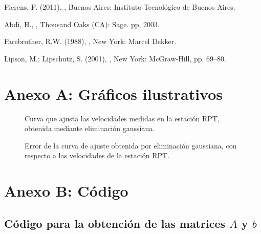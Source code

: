 \documentclass[%
	final,
	reprint,
	notitlepage,
	narroweqnarray,
	inline,
	twoside,
	invited
	]{ieee}
\begin{document}
\begin{thebibliography}{1}

Fierens, P. (2011),
,
\newblock Buenos Aires: Instituto Tecnológico de Buenos Aires.

Abdi, H.,
,
\newblock Thousand Oaks (CA): Sage. pp, 2003.

Farebrother, R.W. (1988),
, \newblock New York: Marcel Dekker.

Lipson, M.; Lipschutz, S. (2001),
, 
\newblock New York: McGraw-Hill, pp. 69–80.


\end{thebibliography}



\clearpage

\onecolumn

\onecolumn
\section*{Anexo A: Gráficos ilustrativos}

\begin{figure}[H]
\centering
\caption{Curva que ajusta las velocidades medidas en la estación RPT, obtenida mediante eliminación gaussiana.}
\label{dataRPT}
\end{figure}

\begin{figure}[H]
\centering
\caption{Error de la curva de ajuste obtenida por eliminación gaussiana, con respecto a las velocidades de la estación RPT.}
\label{dataRPT}
\end{figure}

\clearpage



\section*{Anexo B: Código}

\subsection{Código para la obtención de las matrices $A$ y $b$}

\end{document}
